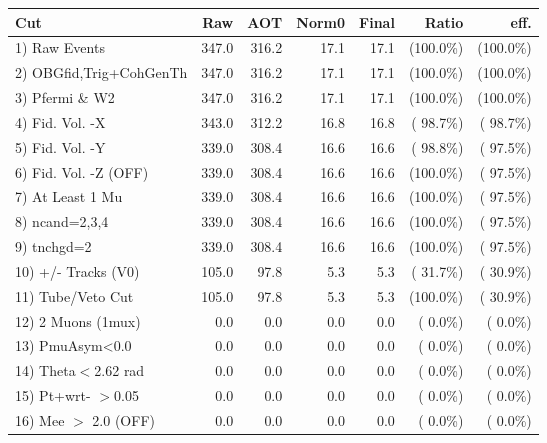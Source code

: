 \begin{table}[h!]\centering
 \begin{tabular}{||l||r|r|r|r|r|r||}
 \hline
 \hline
 Cut & Raw & AOT & Norm0 & Final & Ratio & eff.       \\
 \hline
  1) Raw Events           &        347.0 &        316.2 &         17.1 &         17.1 & (100.0\%) & (100.0\%) \\
  2) OBGfid,Trig+CohGenTh &        347.0 &        316.2 &         17.1 &         17.1 & (100.0\%) & (100.0\%) \\
  3) Pfermi \& W2         &        347.0 &        316.2 &         17.1 &         17.1 & (100.0\%) & (100.0\%) \\
  4) Fid. Vol. -X         &        343.0 &        312.2 &         16.8 &         16.8 & ( 98.7\%) & ( 98.7\%) \\
  5) Fid. Vol. -Y         &        339.0 &        308.4 &         16.6 &         16.6 & ( 98.8\%) & ( 97.5\%) \\
  6) Fid. Vol. -Z (OFF)   &        339.0 &        308.4 &         16.6 &         16.6 & (100.0\%) & ( 97.5\%) \\
  7) At Least 1 Mu        &        339.0 &        308.4 &         16.6 &         16.6 & (100.0\%) & ( 97.5\%) \\
  8) ncand=2,3,4          &        339.0 &        308.4 &         16.6 &         16.6 & (100.0\%) & ( 97.5\%) \\
  9) tnchgd=2             &        339.0 &        308.4 &         16.6 &         16.6 & (100.0\%) & ( 97.5\%) \\
 10) +/- Tracks (V0)      &        105.0 &         97.8 &          5.3 &          5.3 & ( 31.7\%) & ( 30.9\%) \\
 11) Tube/Veto Cut        &        105.0 &         97.8 &          5.3 &          5.3 & (100.0\%) & ( 30.9\%) \\
 12) 2 Muons (1mux)       &          0.0 &          0.0 &          0.0 &          0.0 & (  0.0\%) & (  0.0\%) \\
 13) PmuAsym<0.0          &          0.0 &          0.0 &          0.0 &          0.0 & (  0.0\%) & (  0.0\%) \\
 14) Theta$<$2.62 rad     &          0.0 &          0.0 &          0.0 &          0.0 & (  0.0\%) & (  0.0\%) \\
 15) Pt+wrt- $>$0.05      &          0.0 &          0.0 &          0.0 &          0.0 & (  0.0\%) & (  0.0\%) \\
 16) Mee $>$ 2.0  (OFF)   &          0.0 &          0.0 &          0.0 &          0.0 & (  0.0\%) & (  0.0\%) \\

\end{tabular}
\end{table}

